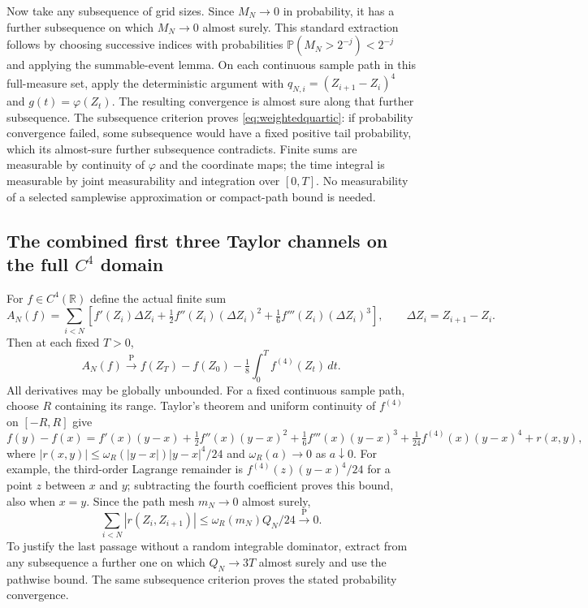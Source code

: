 \documentclass[11pt]{article}
\theoremstyle{remark}\newtheorem{remark}[theorem]{Remark}
\newcommand{\R}{\mathbb R}\newcommand{\Pconv}{\xrightarrow{\mathrm P}}
\begin{document}
Now take any subsequence of grid sizes. Since $M_N\to0$ in
probability, it has a further subsequence on which $M_N\to0$
almost surely. This standard extraction follows by choosing
successive indices with probabilities
$\mathbb P(M_N>2^{-j})<2^{-j}$ and applying the summable-event
lemma. On each continuous sample path in this full-measure set,
apply the deterministic argument with
$q_{N,i}=(Z_{i+1}-Z_i)^4$ and $g(t)=\varphi(Z_t)$.
The resulting convergence is almost sure along that further
subsequence. The subsequence criterion proves
\eqref{eq:weightedquartic}: if probability convergence failed,
some subsequence would have a fixed positive tail probability,
which its almost-sure further subsequence contradicts. Finite
sums are measurable by continuity of $\varphi$ and the coordinate
maps; the time integral is measurable by joint measurability and
integration over $[0,T]$. No measurability of a selected samplewise
approximation or compact-path bound is needed.

\subsection*{The combined first three Taylor channels on the full $C^4$ domain}
For $f\in C^4(\R)$ define the actual finite sum
\[
 A_N(f)=\sum_{i<N}\left[f'(Z_i)\Delta Z_i
            +\tfrac12 f''(Z_i)(\Delta Z_i)^2
            +\tfrac16 f'''(Z_i)(\Delta Z_i)^3\right],
 \qquad\Delta Z_i=Z_{i+1}-Z_i.
\]
Then at each fixed $T>0$,
\begin{equation}\label{eq:c4chain}
 A_N(f)\Pconv f(Z_T)-f(Z_0)-\tfrac18\int_0^T f^{(4)}(Z_t)\,dt.
\end{equation}
All derivatives may be globally unbounded. For a fixed continuous
sample path, choose $R$ containing its range. Taylor's theorem
and uniform continuity of $f^{(4)}$ on $[-R,R]$ give
\[
 f(y)-f(x)=f'(x)(y-x)+\tfrac12f''(x)(y-x)^2
  +\tfrac16f'''(x)(y-x)^3+\tfrac1{24}f^{(4)}(x)(y-x)^4+r(x,y),
\]
where $|r(x,y)|\leq\omega_R(|y-x|)|y-x|^4/24$ and
$\omega_R(a)\to0$ as $a\downarrow0$.
For example, the third-order Lagrange remainder is
$f^{(4)}(z)(y-x)^4/24$ for a point $z$ between $x$ and $y$;
subtracting the fourth coefficient proves this bound, also when
$x=y$. Since the path mesh $m_N\to0$ almost surely,
\[
 \sum_{i<N}|r(Z_i,Z_{i+1})|
       \leq\omega_R(m_N)Q_N/24\Pconv0.
\]
To justify the last passage without a random integrable dominator,
extract from any subsequence a further one on which $Q_N\to3T$
almost surely and use the pathwise bound. The same subsequence
criterion proves the stated probability convergence.
\end{document}
